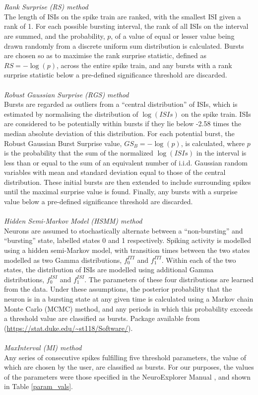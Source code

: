 \documentclass[12pt, titlepage]{article}
\begin{document}
	\\ \\ \textit{Rank Surprise (RS) method \cite{Gourevitch2007}}
	\\The length of ISIs on the spike train are ranked,  with the smallest ISI given a rank of 1. For each possible bursting interval, the rank of all ISIs on the interval are summed, and the probability, $p$, of a value of equal or lesser value  being drawn randomly from a discrete uniform sum distribution is calculated. Bursts are chosen so as to maximise the rank surprise statistic, defined as $RS=-\log(p)$, across the entire spike train, and any bursts with a rank surprise statistic below a pre-defined significance threshold are discarded\nocite{Gourevitch2007}. 
	\\ \\ \textit{Robust Gaussian Surprise (RGS) method \cite{Ko2012}}
	\\Bursts are regarded as outliers from a ``central distribution'' of ISIs, which is estimated by normalising the distribution of $\log(ISIs)$ on the spike train. ISIs are considered to be potentially within bursts if they lie below -2.58 times the median absolute deviation of this distribution. For each potential burst, the Robust Gaussian Burst Surprise value, $GS_B=-\log(p)$, is calculated, where $p$ is the probability that the sum of the normalized $\log(ISIs)$ in the interval is less than or equal to the sum of an equivalent number of i.i.d. Gaussian random variables with mean and standard deviation equal to those of the central distribution. These initial bursts are then extended to include surrounding spikes until the maximal surprise value is found. Finally, any bursts with a surprise value below a pre-defined significance threshold are discarded.
	\\ \\ \textit{Hidden Semi-Markov Model (HSMM) method \cite{Tokdar2010}}
	\\Neurons are assumed to stochastically alternate between a ``non-bursting'' and ``bursting'' state, labelled states 0 and 1 respectively. Spiking activity is modelled using a hidden semi-Markov model, with transition times between the two states modelled as two Gamma distributions,  $f_0^{ITI}$ and $f_1^{ITI}$.  Within each of the two states, the distribution of ISIs are modelled using additional Gamma distributions, $f_0^{ISI}$ and $f_1^{ISI}$. The parameters of these four distributions are learned from the data. Under these assumptions, the posterior probability that the neuron is in a bursting state at any given time is calculated using a Markov chain Monte Carlo (MCMC) method, and any periods in which this probability exceeds a threshold value are classified as bursts. Package available from (\url{https://stat.duke.edu/~st118/Software/}).
	\\ \\ \textit{MaxInterval (MI) method  \cite{NEmanual}}
	\\Any series of consecutive spikes fulfilling five threshold parameters, the value of which are chosen by the user, are classified as bursts. For our purposes, the values of the parameters were those specified in the NeuroExplorer Manual \cite{NEmanual}, and shown in Table \ref{param_vals}.
\end{document}
